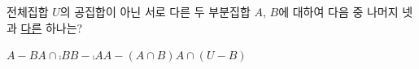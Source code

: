 전체집합 $U$의 공집합이 아닌 서로 다른 두 부분집합 $A$, $B$에 대하여 다음 중 나머지 넷과 \underline{다른} 하나는?
\begin{choices32}{$A-B$}{$A\cap\comp{B}$}{$B-\comp{A}$}{$A-(A\cap B)$}{$A\cap(U-B)$}\end{choices32}
